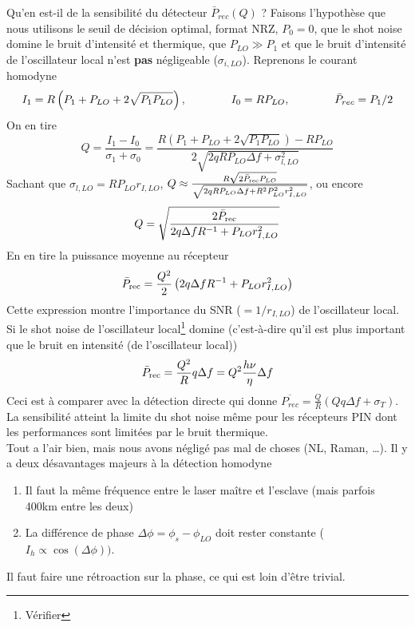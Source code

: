 Qu'en est-il de la sensibilité du détecteur $\bar{P}_{rec}(Q)$ ? Faisons l'hypothèse que nous
utilisons le seuil de décision optimal, format NRZ, $P_0=0$, que le shot noise domine le bruit
d'intensité et thermique, que $P_{LO}\gg P_1$ et que le bruit d'intensité de l'oscillateur local
n'est \textbf{pas} négligeable ($\sigma_{i,LO}$). Reprenons le courant homodyne
\begin{equation}
{I_1} = R\left( {{P_1} + {P_{LO}} + 2\sqrt {{P_1}{P_{LO}}} } \right),\qquad\qquad
{I_0} = R{P_{LO}},\qquad\qquad
{\bar P_{rec}} = {P_1}/2{\rm{ }}
\end{equation}
On en tire
\begin{equation}
Q = \frac{{{I_1} - {I_0}}}{{{\sigma _1} + {\sigma _0}}} = \frac{{R\left( {{P_1} + {P_{LO}} + 2\sqrt {{P_1}{P_{LO}}} } \right) - R{P_{LO}}}}{{2\sqrt {2qR{P_{LO}}\Delta f + \sigma _{l,LO}^2} }}
\end{equation}
Sachant que ${\sigma _{l,LO}} = RP_{LO}^{}r_{I,LO}^{}$, $Q \approx \frac{{R\sqrt {2{{\bar P}
_{{\rm{rec}}}}{P_{LO}}} }}{{\sqrt {2qR{P_{LO}}\Delta f + {R^2}P_{LO}^2r_{I,LO}^2} }}$, ou encore
\begin{equation}
Q = \sqrt {\frac{{2{{\bar P}_{{\rm{rec}}}}}}{{2q\Delta f{R^{ - 1}} + {P_{LO}}r_{I,LO}^2}}} 
\end{equation}
En en tire la puissance moyenne au récepteur
\begin{equation}
{\bar P_{{\rm{rec}}}} = \frac{{{Q^2}}}{2}\left( {2q\Delta f{R^{ - 1}} + {P_{LO}}r_{I,LO}^2} \right)
\end{equation}
Cette expression montre l'importance du SNR ($=1/r_{I,LO}$) de l'oscillateur local. Si le shot noise
de l'oscillateur local\footnote{Vérifier} domine (c'est-à-dire qu'il est plus important que le bruit
en intensité (de l'oscillateur local))
\begin{equation}
{\bar P_{{\rm{rec}}}} = \frac{{{Q^2}}}{R}q\Delta f = {Q^2}\frac{{h\nu }}{\eta }\Delta f
\end{equation}
Ceci est à comparer avec la détection directe qui donne $\overline {{P_{rec}}}  = \frac{Q}{R}
\left( {Qq\Delta f + {\sigma _T}} \right)$. La sensibilité atteint la limite du shot noise même
pour les récepteurs PIN dont les performances sont limitées par le bruit thermique.\\

Tout a l'air bien, mais nous avons négligé pas mal de choses (NL, Raman, \dots). Il y a deux 
désavantages majeurs à la détection homodyne
\begin{enumerate}
\item Il faut la même fréquence entre le laser maître et l'esclave (mais parfois 400km entre les
deux)
\item La différence de phase $\Delta \phi = \phi_s - \phi_{LO}$ doit rester constante
($I_h\propto \cos(\Delta \phi))$.
\end{enumerate}
Il faut faire une rétroaction sur la phase, ce qui est loin d'être trivial.


